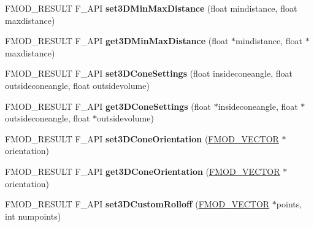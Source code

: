 \begin{DoxyCompactItemize}
\item 
\mbox{\label{classFMOD_1_1ChannelControl_abdf3cebe9997771b6844819ee7eb85e9}} 
F\+M\+O\+D\+\_\+\+R\+E\+S\+U\+LT F\+\_\+\+A\+PI {\bfseries set3\+D\+Min\+Max\+Distance} (float mindistance, float maxdistance)
\item 
\mbox{\label{classFMOD_1_1ChannelControl_ab8dadcd83013ea4826bd8e44cb73ebc5}} 
F\+M\+O\+D\+\_\+\+R\+E\+S\+U\+LT F\+\_\+\+A\+PI {\bfseries get3\+D\+Min\+Max\+Distance} (float $\ast$mindistance, float $\ast$maxdistance)
\item 
\mbox{\label{classFMOD_1_1ChannelControl_ab65692317899c31d68e84cb1127840ff}} 
F\+M\+O\+D\+\_\+\+R\+E\+S\+U\+LT F\+\_\+\+A\+PI {\bfseries set3\+D\+Cone\+Settings} (float insideconeangle, float outsideconeangle, float outsidevolume)
\item 
\mbox{\label{classFMOD_1_1ChannelControl_a2189e119ad2569ffdc58396deb9f8967}} 
F\+M\+O\+D\+\_\+\+R\+E\+S\+U\+LT F\+\_\+\+A\+PI {\bfseries get3\+D\+Cone\+Settings} (float $\ast$insideconeangle, float $\ast$outsideconeangle, float $\ast$outsidevolume)
\item 
\mbox{\label{classFMOD_1_1ChannelControl_a593550467390c1786ca195d1092010b1}} 
F\+M\+O\+D\+\_\+\+R\+E\+S\+U\+LT F\+\_\+\+A\+PI {\bfseries set3\+D\+Cone\+Orientation} (\hyperlink{structFMOD__VECTOR}{F\+M\+O\+D\+\_\+\+V\+E\+C\+T\+OR} $\ast$orientation)
\item 
\mbox{\label{classFMOD_1_1ChannelControl_ac38d4525218249954c2efc5d55cec048}} 
F\+M\+O\+D\+\_\+\+R\+E\+S\+U\+LT F\+\_\+\+A\+PI {\bfseries get3\+D\+Cone\+Orientation} (\hyperlink{structFMOD__VECTOR}{F\+M\+O\+D\+\_\+\+V\+E\+C\+T\+OR} $\ast$orientation)
\item 
\mbox{\label{classFMOD_1_1ChannelControl_abf2c27cef2ec7500559855aa270b8669}} 
F\+M\+O\+D\+\_\+\+R\+E\+S\+U\+LT F\+\_\+\+A\+PI {\bfseries set3\+D\+Custom\+Rolloff} (\hyperlink{structFMOD__VECTOR}{F\+M\+O\+D\+\_\+\+V\+E\+C\+T\+OR} $\ast$points, int numpoints)
\item 
\mbox{\label{classFMOD_1_1ChannelControl_af4cafc98f162dab49c4eb17ac547ec3e}} 

\end{DoxyCompactItemize}
